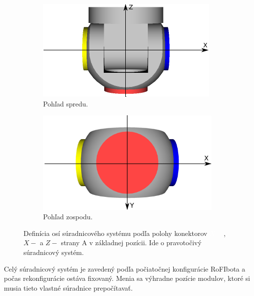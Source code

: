 \documentclass[
  digital, %
  oneside, %
  table,   %
  lof,     %
  nolot,     %
]{fithesis3}
\begin{document}
\begin{figure}[hbt!]
    \centering
    \begin{subfigure}[b]{0.47\textwidth}
        \includegraphics[width=\textwidth]{pictures/module_dock_identification.pdf}
        \caption[Pohľad spredu]{Pohľad spredu.}
    \end{subfigure}
    \begin{subfigure}[b]{0.47\textwidth}
        \includegraphics[width=\textwidth]{pictures/module_dock_identification_bottom.pdf}
        \caption[Pohľad zospodu]{Pohľad zospodu.}
    \end{subfigure}
    \caption[Definícia osí súradnicového systému]{Definícia osí súradnicového systému podľa polohy konektorov \textcolor{white}{\colorbox{modra}{$X+$}}, \colorbox{zlta}{$X-$} a \colorbox{cervena}{$Z-$} strany A v základnej pozícii. Ide o pravotočivý súradnicový systém. }
    \label{fig:moduleAxis}
\end{figure}

Celý súradnicový systém je zavedený podľa počiatočnej konfigurácie RoFIbota a počas rekonfigurácie ostáva fixovaný. Menia sa výhradne pozície modulov, ktoré si musia tieto vlastné súradnice prepočítavať. 
\end{document}
